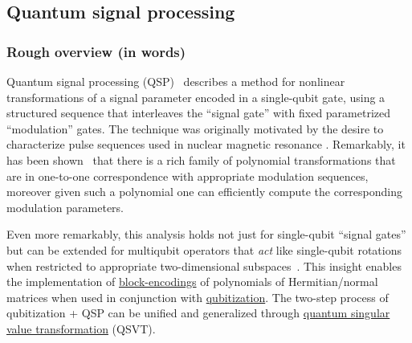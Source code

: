 \begin{refsection}

\subsection{Quantum signal processing}\label{prim:QSP}

\subsubsection*{Rough overview (in words)}
Quantum signal processing (QSP)~\cite{low2016CompositeQuantGates} describes a method for nonlinear transformations of a signal parameter encoded in a single-qubit gate, using a structured sequence that interleaves the ``signal gate'' with fixed parametrized ``modulation'' gates. The technique was originally motivated by the desire to characterize pulse sequences used in nuclear magnetic resonance \cite{low2016CompositeQuantGates}. Remarkably, it has been shown~\cite{low2016CompositeQuantGates,haah2018ProdDecPerFuncQSignPRoc} that there is a rich family of polynomial transformations that are in one-to-one correspondence with appropriate modulation sequences, moreover given such a polynomial one can efficiently compute the corresponding modulation parameters. 

Even more remarkably, this analysis holds not just for single-qubit ``signal gates'' but can be extended for multiqubit operators that \textit{act} like single-qubit rotations when restricted to appropriate two-dimensional subspaces~\cite{low2016HamSimQSignProc}. This insight enables the implementation of \hyperref[prim:BlockEncodings]{block-encodings} of polynomials of Hermitian/normal matrices when used in conjunction with \hyperref[prim:Qubitization]{qubitization}. The two-step process of qubitization + QSP can be unified and generalized through \hyperref[prim:QSVT]{quantum singular value transformation} (QSVT).



\end{refsection}
